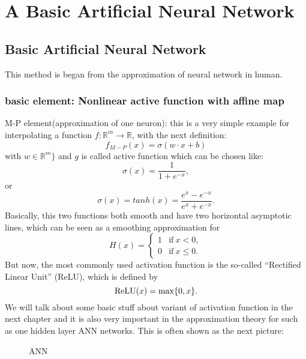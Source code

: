 \chapter{A Basic Artificial Neural Network}

\section{Basic Artificial Neural Network}
This method is began from the approximation of neural network in human.
\subsection{basic element: Nonlinear active function with affine map}
M-P element(approximation of one neuron): this is a very simple example for interpolating a function $f: \mathbb{R}^m \to \mathbb{R}$, with the next definition:
\begin{equation}\label{eq:M-P}
f_{M-P}(x) = \sigma( w \cdot x + b)
\end{equation}
with $w  \in \mathbb{R}^{m} \}$ and $g$ is called active function which can be chosen like:
\begin{equation}
\sigma (x) = \frac{1}{1 + e^{-x}},
\end{equation}
or
\begin{equation}
\sigma(x) = tanh(x) = \frac{e^x - e^{-x}}{e^x + e^{-x}}.
\end{equation}
Basically, this two functions both smooth and have two horizontal asymptotic lines, which can be seen as a smoothing approximation for
\begin{equation}
H(x) =
\begin{cases}
1  &\text{if}  ~x < 0, \\
0 &\text{if}~ x \le 0.
\end{cases}
\end{equation}
But now, the most commonly used activation function is the so-called ``Rectified Linear Unit'' (ReLU), which is defined by
\begin{equation}
{\rm ReLU}(x) = \max\{0,x\}.
\end{equation}
We will talk about some basic stuff about variant of activation function in the next chapter and it is also very important in the approximation theory for such as one hidden layer ANN networks.
This is often shown as the next picture:
\begin{figure}[!ht]
	\caption{ANN}
\end{figure}

